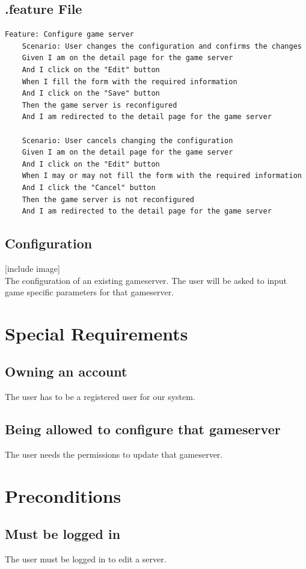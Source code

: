 \documentclass[a4paper,12pt,chapterprefix=false,bibliography=totoc,listof=totoc,]{scrreprt}
\begin{document}
\section{.feature File}
\begin{lstlisting}[language=Gherkin]
Feature: Configure game server
    Scenario: User changes the configuration and confirms the changes
    Given I am on the detail page for the game server
    And I click on the "Edit" button
    When I fill the form with the required information
    And I click on the "Save" button
    Then the game server is reconfigured
    And I am redirected to the detail page for the game server
    
    Scenario: User cancels changing the configuration
    Given I am on the detail page for the game server
    And I click on the "Edit" button
    When I may or may not fill the form with the required information
    And I click the "Cancel" button
    Then the game server is not reconfigured
    And I am redirected to the detail page for the game server
\end{lstlisting}


\section{Configuration}
[include image]\\
The configuration of an existing gameserver. The user will be asked to input game specific parameters for that gameserver.

\chapter{Special Requirements}

\section{Owning an account}
The user has to be a registered user for our system.

\section{Being allowed to configure that gameserver}
The user needs the permissions to update that gameserver.

\chapter{Preconditions}
\section{Must be logged in}
The user must be logged in to edit a server.
\end{document}
